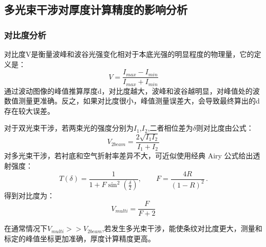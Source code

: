 \documentclass[a4paper]{ctexart}
\begin{document}




\subsection{多光束干涉对厚度计算精度的影响分析}
\subsubsection{对比度分析}
对比度V是衡量波峰和波谷光强变化相对于本底光强的明显程度的物理量，它的定义是：
\begin{equation}
    V = \frac{I_{max} - I_{min}}{I_{max} + I_{min}}
\end{equation}
通过波动图像的峰值推算厚度d，对比度越大，波峰和波谷越明显，对峰值处的波数值测量更准确。反之，如果对比度很小，峰值测量误差大，会导致最终算出的d存在较大误差。

对于双光束干涉，若两束光的强度分别为$I_1$,$I_2$,二者相位差为$\delta$则对比度由公式：
\begin{equation}
    V_{2beam} = \frac{2\sqrt{I_1I_2}}{I_1 + I_2}
\end{equation}
对多光束干涉，若衬底和空气折射率差异不大，可近似使用经典 Airy 公式给出透射强度：
\begin{equation}
T(\delta) = \frac{1}{1 + F \sin^{2}\!\left(\tfrac{\delta}{2}\right)}, 
\qquad 
F = \frac{4R}{(1 - R)^{2}} \, .
\end{equation}
得到对比度为：
\begin{equation}
    V_{multi} = \frac{F}{F+2}
\end{equation}

在通常情况下$V_{multi} >> V_{2beam}$,若发生多光束干涉，能使条纹对比度更大，测量和标定的峰值坐标更加准确，厚度计算精度更高。
\end{document}

